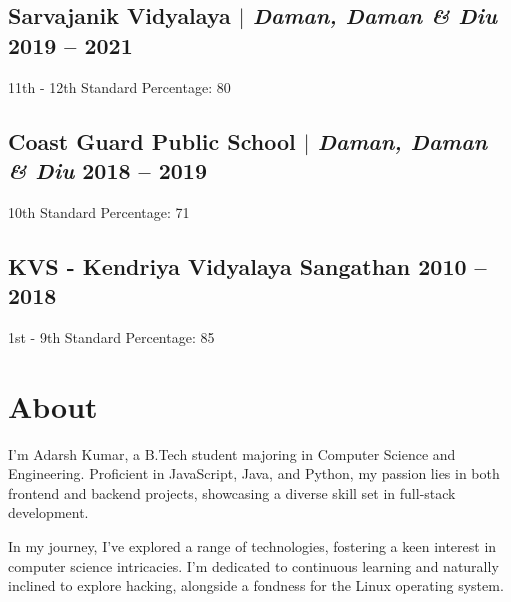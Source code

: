\documentclass[11pt]{article}
\begin{document}
\subsection{Sarvajanik Vidyalaya $|$ {\normalfont\textit{Daman, Daman & Diu}} \hfill 2019 -- 2021}
{11th - 12th Standard \hfill Percentage: 80%

\subsection{Coast Guard Public School $|$ {\normalfont\textit{Daman, Daman & Diu}} \hfill 2018 -- 2019}
{10th Standard \hfill Percentage: 71%

\subsection{KVS - Kendriya Vidyalaya Sangathan \hfill 2010 -- 2018}
{1st - 9th Standard \hfill Percentage: 85%



\section{About}
\begin{itemize}[leftmargin=0.15in, label={}]
    \small{\item{
     I'm Adarsh Kumar, a B.Tech student majoring in Computer Science and Engineering. Proficient in JavaScript, Java, and Python, my passion lies in both frontend and backend projects, showcasing a diverse skill set in full-stack development.

    In my journey, I've explored a range of technologies, fostering a keen interest in computer science intricacies. I'm dedicated to continuous learning and naturally inclined to explore hacking, alongside a fondness for the Linux operating system.
    
}}
\end{itemize}}}}
\end{document}
